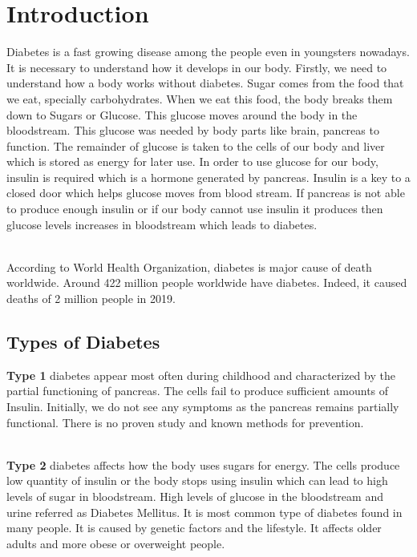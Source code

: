 \chapter{Introduction}
\label{ch:into} %
Diabetes is a fast growing disease among the people even in youngsters nowadays. It is necessary to understand how it develops in our body. Firstly, we need to understand how a body works without diabetes. Sugar comes from the food that we eat, specially carbohydrates. When we eat this food, the body breaks them down to Sugars or Glucose. This glucose moves around the body in the bloodstream. This glucose was needed by body parts like brain, pancreas to function. The remainder of glucose is taken to the cells of our body and liver which is stored as energy for later use. In order to use glucose for our body, insulin is required which is a hormone generated by pancreas. Insulin is a key to a closed door which helps glucose moves from blood stream. If pancreas is not able to produce enough insulin or if our body cannot use insulin it produces then glucose levels increases in bloodstream which leads to diabetes.

~\\[0cm]
According to World Health Organization, diabetes is major cause of death worldwide. Around 422 million people worldwide have diabetes. Indeed, it caused deaths of 2 million people in 2019.

\section*{Types of Diabetes}
\textbf{Type 1} diabetes appear most often during childhood and characterized by the partial functioning of pancreas. The cells fail to produce sufficient amounts of Insulin. Initially, we do not see any symptoms as the pancreas remains partially functional. There is no proven study and known methods for prevention.

~\\[0cm]
\textbf{Type 2} diabetes affects how the body uses sugars for energy. The cells produce low quantity of insulin or the body stops using insulin which can lead to high levels of sugar in bloodstream. High levels of glucose in the bloodstream and urine referred as Diabetes Mellitus. It is most common type of diabetes found in many people. It is caused by genetic factors and the lifestyle. It affects older adults and more obese or overweight people.

